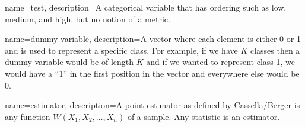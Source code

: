 {
        name={test},
        description={A categorical variable that has ordering such as low, medium, and high, but no notion of a metric.}
}

{
        name={dummy variable},
        description={A vector where each element is either 0 or 1 and is used to represent a specific class. For example, if we have $K$ classes then a dummy variable would be of length $K$ and if we wanted to represent class 1, we would have a ``1'' in the first position in the vector and everywhere else would be 0.}
}

{
        name={estimator},
        description={A point estimator as defined by Cassella/Berger is any function $W(X_1, X_2, ..., X_n)$ of a sample. Any statistic is an estimator.}
}


%
%



